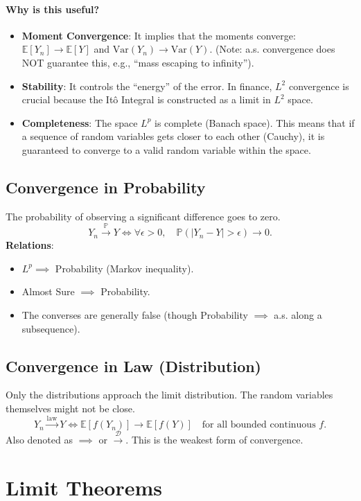 \paragraph{Why is this useful?}
\begin{itemize}
    \item \textbf{Moment Convergence}: It implies that the moments converge: $\mathbb{E}[Y_n] \to \mathbb{E}[Y]$ and $\text{Var}(Y_n) \to \text{Var}(Y)$. (Note: a.s. convergence does NOT guarantee this, e.g., ``mass escaping to infinity'').
    \item \textbf{Stability}: It controls the ``energy'' of the error. In finance, $L^2$ convergence is crucial because the Itô Integral is constructed as a limit in $L^2$ space.
    \item \textbf{Completeness}: The space $L^p$ is complete (Banach space). This means that if a sequence of random variables gets closer to each other (Cauchy), it is guaranteed to converge to a valid random variable within the space.
\end{itemize}

\subsection{Convergence in Probability}
The probability of observing a significant difference goes to zero.
\[
Y_n \xrightarrow{\mathbb{P}} Y \iff \forall \epsilon > 0, \quad \mathbb{P}(|Y_n - Y| > \epsilon) \to 0.
\]
\textbf{Relations}:
\begin{itemize}
    \item $L^p \implies$ Probability (Markov inequality).
    \item Almost Sure $\implies$ Probability.
    \item The converses are generally false (though Probability $\implies$ a.s. along a subsequence).
\end{itemize}

\subsection{Convergence in Law (Distribution)}
Only the distributions approach the limit distribution. The random variables themselves might not be close.
\[
Y_n \xrightarrow{\text{law}} Y \iff \mathbb{E}[f(Y_n)] \to \mathbb{E}[f(Y)] \quad \text{for all bounded continuous } f.
\]
Also denoted as $\implies$ or $\xrightarrow{\mathcal{D}}$. This is the weakest form of convergence.

\section{Limit Theorems}

